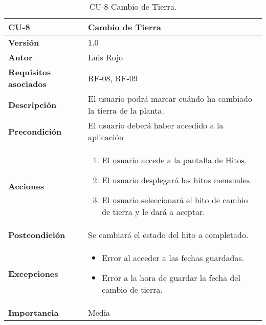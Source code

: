 \begin{table}[p]
	\centering
	\begin{tabularx}{\linewidth}{ p{} p{} }
		\toprule
		\textbf{CU-8}    & \textbf{Cambio de Tierra}\\
		\toprule
		\textbf{Versión}              & 1.0    \\
		\textbf{Autor}                & Luis Rojo \\
		\textbf{Requisitos asociados} & RF-08, RF-09 \\
		\textbf{Descripción}          & El usuario podrá marcar cuándo ha cambiado la tierra de la planta. \\
		\textbf{Precondición}         &  El usuario deberá haber accedido a la aplicación \\
		\textbf{Acciones}             &
		\begin{enumerate}
			\def\labelenumi{\arabic{enumi}.}
			\tightlist
			\item El usuario accede a la pantalla de Hitos.
                \item El usuario desplegará los hitos mensuales.
			\item El usuario seleccionará el hito de cambio de tierra y le dará a aceptar.
		\end{enumerate}\\
		\textbf{Postcondición}        & Se cambiará el estado del hito a completado. \\
		\textbf{Excepciones}          &  
            \begin{itemize}
                \item Error al acceder a las fechas guardadas.
                \item Error a la hora de guardar la fecha del cambio de tierra.
            \end{itemize}
           \\
		\textbf{Importancia}          & Media  \\
		\bottomrule
	\end{tabularx}
	\caption{CU-8 Cambio de Tierra.}
\end{table}


